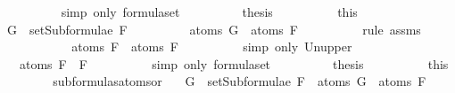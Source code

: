 \begin{isabellebody}
\ \ \ \ \ \ \ \ \isamarkupfalse%
\ {\isacharparenleft}simp\ only{\isacharcolon}\ formula{\isachardot}set{\isacharparenleft}{}{\isacharparenright}{\isacharparenright}\isanewline
\ \ \ \ \ \ \isamarkupfalse%
\ \isamarkupfalse%
\ {\isacharquery}thesis\isanewline
\ \ \ \ \ \ \ \ \isamarkupfalse%
\ this\isanewline
\ \ \ \ \isamarkupfalse%
\isanewline
\ \ \ \ \ \ \isamarkupfalse%
\ {\isachardoublequoteopen}G\ {\isasymin}\ setSubformulae\ F{}{\isachardoublequoteclose}\isanewline
\ \ \ \ \ \ \isamarkupfalse%
\ \isamarkupfalse%
\ {\isachardoublequoteopen}atoms\ G\ {\isasymsubseteq}\ atoms\ F{}{\isachardoublequoteclose}\isanewline
\ \ \ \ \ \ \ \ \isamarkupfalse%
\ {\isacharparenleft}rule\ assms{\isacharparenleft}{}{\isacharparenright}{\isacharparenright}\isanewline
\ \ \ \ \ \ \isamarkupfalse%
\ \isamarkupfalse%
\ {\isachardoublequoteopen}{\isasymdots}\ {\isasymsubseteq}\ atoms\ F{}\ {\isasymunion}\ atoms\ F{}{\isachardoublequoteclose}\isanewline
\ \ \ \ \ \ \ \ \isamarkupfalse%
\ {\isacharparenleft}simp\ only{\isacharcolon}\ Un{\isacharunderscore}upper{}{\isacharparenright}\isanewline
\ \ \ \ \ \ \isamarkupfalse%
\ \isamarkupfalse%
\ {\isachardoublequoteopen}{\isasymdots}\ {\isacharequal}\ atoms\ {\isacharparenleft}F{}\ \isactrlbold {\isasymand}\ F{}{\isacharparenright}{\isachardoublequoteclose}\isanewline
\ \ \ \ \ \ \ \ \isamarkupfalse%
\ {\isacharparenleft}simp\ only{\isacharcolon}\ formula{\isachardot}set{\isacharparenleft}{}{\isacharparenright}{\isacharparenright}\isanewline
\ \ \ \ \ \ \isamarkupfalse%
\ \isamarkupfalse%
\ {\isacharquery}thesis\isanewline
\ \ \ \ \ \ \ \ \isamarkupfalse%
\ this\isanewline
\ \ \ \ \isamarkupfalse%
\isanewline
\ \ \isamarkupfalse%
\isanewline
{}\isamarkupfalse%
%
\endisatagproof
{\isafoldproof}%
%
\isadelimproof
\isanewline
%
\endisadelimproof
\isanewline
{}\isamarkupfalse%
\ subformulas{\isacharunderscore}atoms{\isacharunderscore}or{\isacharcolon}\isanewline
\ \ \ {\isachardoublequoteopen}G\ {\isasymin}\ setSubformulae\ F{}\ {\isasymLongrightarrow}\ atoms\ G\ {\isasymsubseteq}\ atoms\ F{}{\isachardoublequoteclose}\isanewline

\end{isabellebody}
